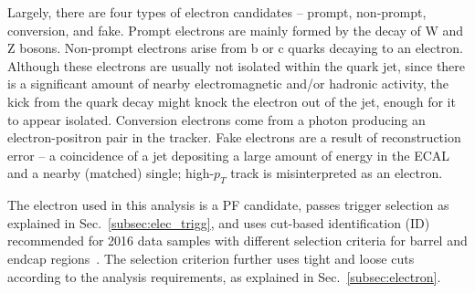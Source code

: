 Largely, there are four types of electron candidates – prompt, non-prompt, conversion, and fake. Prompt electrons are mainly formed by the decay of W and Z bosons. Non-prompt electrons arise from b or c quarks decaying to an electron. Although these electrons are usually not isolated within the quark jet, since there is a significant amount of nearby electromagnetic and/or hadronic activity, the kick from the quark decay might knock the electron out of the jet, enough for it to appear isolated. Conversion electrons come from a photon producing an electron-positron pair in the tracker. Fake electrons are a result of reconstruction error – a coincidence of a jet depositing a large amount of energy in the ECAL and a nearby (matched) single; high-$p_T$ track is misinterpreted as an electron. 

The electron used in this analysis is a PF candidate, passes trigger selection as explained in Sec.~\ref{subsec:elec_trigg}, and uses cut-based identification (ID) recommended for 2016 data samples with different selection criteria for barrel and endcap regions~\cite{Wiki:ElectronID}. The selection criterion further uses tight and loose cuts according to the analysis requirements, as explained in Sec.~\ref{subsec:electron}. 

